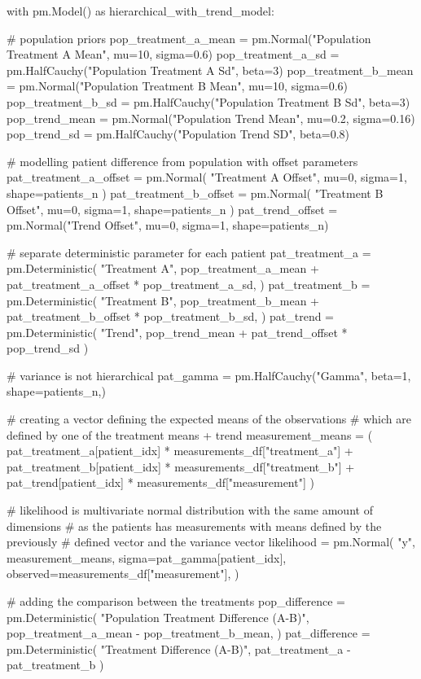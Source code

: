 \documentclass[12pt,a4paper,leqno]{report}
\theoremstyle{plain}
\theoremstyle{definition}
\theoremstyle{remark}
\begin{document}
\bigskip
\begin{pyverbatim}[][fontsize=\footnotesize]
with pm.Model() as hierarchical_with_trend_model:

    # population priors
    pop_treatment_a_mean = pm.Normal("Population Treatment A Mean", mu=10, sigma=0.6)
    pop_treatment_a_sd = pm.HalfCauchy("Population Treatment A Sd", beta=3)
    pop_treatment_b_mean = pm.Normal("Population Treatment B Mean", mu=10, sigma=0.6)
    pop_treatment_b_sd = pm.HalfCauchy("Population Treatment B Sd", beta=3)
    pop_trend_mean = pm.Normal("Population Trend Mean", mu=0.2, sigma=0.16)
    pop_trend_sd = pm.HalfCauchy("Population Trend SD", beta=0.8)

    # modelling patient difference from population with offset parameters
    pat_treatment_a_offset = pm.Normal(
        "Treatment A Offset", mu=0, sigma=1, shape=patients_n
    )
    pat_treatment_b_offset = pm.Normal(
        "Treatment B Offset", mu=0, sigma=1, shape=patients_n
    )
    pat_trend_offset = pm.Normal("Trend Offset", mu=0, sigma=1, shape=patients_n)

    # separate deterministic parameter for each patient
    pat_treatment_a = pm.Deterministic(
        "Treatment A",
        pop_treatment_a_mean + pat_treatment_a_offset * pop_treatment_a_sd,
    )
    pat_treatment_b = pm.Deterministic(
        "Treatment B",
        pop_treatment_b_mean + pat_treatment_b_offset * pop_treatment_b_sd,
    )
    pat_trend = pm.Deterministic(
        "Trend", pop_trend_mean + pat_trend_offset * pop_trend_sd
    )

    # variance is not hierarchical
    pat_gamma = pm.HalfCauchy("Gamma", beta=1, shape=patients_n,)

    # creating a vector defining the expected means of the observations
    # which are defined by one of the treatment means + trend
    measurement_means = (
        pat_treatment_a[patient_idx] * measurements_df["treatment_a"]
        + pat_treatment_b[patient_idx] * measurements_df["treatment_b"]
        + pat_trend[patient_idx] * measurements_df["measurement"]
    )

    # likelihood is multivariate normal distribution with the same amount of dimensions
    # as the patients has measurements with means defined by the previously
    # defined vector and the variance vector
    likelihood = pm.Normal(
        "y",
        measurement_means,
        sigma=pat_gamma[patient_idx],
        observed=measurements_df["measurement"],
    )

    # adding the comparison between the treatments
    pop_difference = pm.Deterministic(
        "Population Treatment Difference (A-B)",
        pop_treatment_a_mean - pop_treatment_b_mean,
    )
    pat_difference = pm.Deterministic(
        "Treatment Difference (A-B)", pat_treatment_a - pat_treatment_b
    )


\end{pyverbatim}
\end{document}
